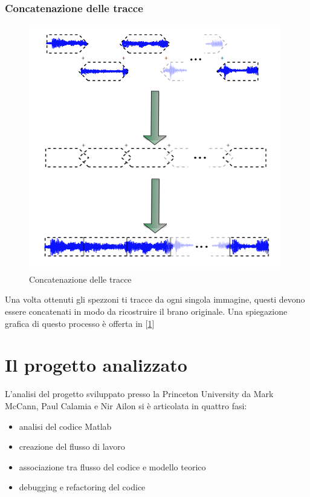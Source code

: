 \subsubsection{Concatenazione delle tracce}
\begin{figure}[h!t]
\begin{center}
\includegraphics[scale=0.4]{./img/concatenation.png}
\caption{Concatenazione delle tracce}\label{fading}
\end{center}
\end{figure}
Una volta ottenuti gli spezzoni ti tracce da ogni singola immagine, questi devono essere concatenati in modo da ricostruire il brano originale. Una spiegazione grafica di questo processo \`e offerta in [\ref{fading}]
\section{Il progetto analizzato}
L'analisi del progetto sviluppato presso la Princeton University da Mark McCann, Paul Calamia e Nir Ailon si \`e articolata in quattro fasi:
\begin{itemize}
\item analisi del codice Matlab
\item creazione del flusso di lavoro
\item associazione tra flusso del codice e modello teorico
\item debugging e refactoring del codice
\end{itemize}

